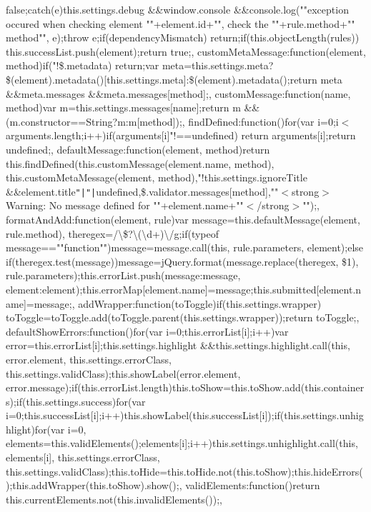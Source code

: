false;\rcurly{}\rcurly{}catch(e)\lcurly{}this.\+settings.\+debug \&\&window.\+console \&\&console.\+log(""exception occured when checking element ""+element.\+id+"", check the \textquotesingle{}""+rule.\+method+""\textquotesingle{} method"", e);throw e;\rcurly{}\rcurly{}if(dependency\+Mismatch) return;if(this.\+object\+Length(rules)) this.\+success\+List.\+push(element);return true;\rcurly{},   custom\+Meta\+Message\+:function(element, method)\lcurly{}if("!\$.\+metadata) return;var meta=this.\+settings.\+meta?\$(element).\+metadata()[this.\+settings.\+meta]\+:\$(element).\+metadata();return meta \&\&meta.\+messages \&\&meta.\+messages[method];\rcurly{}, custom\+Message\+:function(name, method)\lcurly{}var m=this.\+settings.\+messages[name];return m \&\&(m.\+constructor==\+String?m\+:m[method]);\rcurly{}, find\+Defined\+:function()\lcurly{}for(var i=0;i$<$ arguments.\+length;i++)\lcurly{}if(arguments[i]"!==undefined) return arguments[i];\rcurly{}return undefined;\rcurly{}, default\+Message\+:function(element, method)\lcurly{}return this.\+find\+Defined(this.\+custom\+Message(element.\+name, method), this.\+custom\+Meta\+Message(element, method),"!this.\+settings.\+ignore\+Title \&\&element.\+title\texttt{"|}\texttt{"|}undefined,\$.\+validator.\+messages[method],""$<$strong$>$\+Warning\+: No message defined for ""+element.\+name+""$<$/strong$>$"");\rcurly{}, format\+And\+Add\+:function(element, rule)\lcurly{}var message=this.\+default\+Message(element, rule.\+method), theregex=/\textbackslash{}\$?\textbackslash{}\lcurly{}(\textbackslash{}d+)\textbackslash{}\rcurly{}/g;if(typeof message==""function"")\lcurly{}message=message.\+call(this, rule.\+parameters, element);\rcurly{}else if(theregex.\+test(message))\lcurly{}message=j\+Query.\+format(message.\+replace(theregex, \textquotesingle{}\lcurly{}\$1\rcurly{}\textquotesingle{}), rule.\+parameters);\rcurly{}this.\+error\+List.\+push(\lcurly{}message\+:message, element\+:element\rcurly{});this.\+error\+Map[element.\+name]=message;this.\+submitted[element.\+name]=message;\rcurly{}, add\+Wrapper\+:function(to\+Toggle)\lcurly{}if(this.\+settings.\+wrapper) to\+Toggle=to\+Toggle.\+add(to\+Toggle.\+parent(this.\+settings.\+wrapper));return to\+Toggle;\rcurly{}, default\+Show\+Errors\+:function()\lcurly{}for(var i=0;this.\+error\+List[i];i++)\lcurly{}var error=this.\+error\+List[i];this.\+settings.\+highlight \&\&this.\+settings.\+highlight.\+call(this, error.\+element, this.\+settings.\+error\+Class, this.\+settings.\+valid\+Class);this.\+show\+Label(error.\+element, error.\+message);\rcurly{}if(this.\+error\+List.\+length)\lcurly{}this.\+to\+Show=this.\+to\+Show.\+add(this.\+containers);\rcurly{}if(this.\+settings.\+success)\lcurly{}for(var i=0;this.\+success\+List[i];i++)\lcurly{}this.\+show\+Label(this.\+success\+List[i]);\rcurly{}\rcurly{}if(this.\+settings.\+unhighlight)\lcurly{}for(var i=0, elements=this.\+valid\+Elements();elements[i];i++)\lcurly{}this.\+settings.\+unhighlight.\+call(this, elements[i], this.\+settings.\+error\+Class, this.\+settings.\+valid\+Class);\rcurly{}\rcurly{}this.\+to\+Hide=this.\+to\+Hide.\+not(this.\+to\+Show);this.\+hide\+Errors();this.\+add\+Wrapper(this.\+to\+Show).\+show();\rcurly{}, valid\+Elements\+:function()\lcurly{}return this.\+current\+Elements.\+not(this.\+invalid\+Elements());\rcurly{}, 